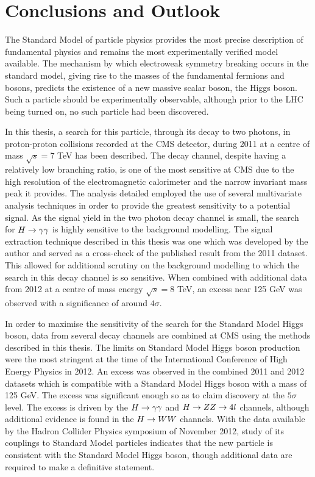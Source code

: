 \chapter{Conclusions and Outlook}
\label{chap:conclusions}

The Standard Model of particle physics provides the most precise description of 
fundamental physics and remains  the most experimentally verified
model available. The mechanism by which electroweak symmetry breaking occurs 
in the standard model, giving rise to the masses of the fundamental fermions and
bosons, predicts the existence of a new massive scalar boson, the Higgs boson.
Such a particle should be experimentally observable, although prior to the LHC being
turned on, no such particle had been discovered.

In this thesis, a search for this particle, through its decay to two photons, in proton-proton collisions recorded at the CMS detector, during 2011 at a centre of mass $\sqrt{s}=7$ TeV
has been described. 
The decay channel, despite having a 
relatively low branching ratio, is one of the most sensitive at CMS 
due to the high resolution 
of the electromagnetic calorimeter and the narrow invariant mass peak it provides.
The analysis detailed employed the use of several multivariate analysis techniques
in order to provide the greatest sensitivity to a potential signal.
As the signal yield in the two photon decay channel is small, 
the search for $H\rightarrow\gamma\gamma$ is highly sensitive to the background modelling.
The signal extraction technique described in this thesis was one which was 
developed by the author and served as a cross-check of the published result from the 2011 dataset.
This allowed for additional scrutiny on the background modelling 
to which the search in this decay channel is so sensitive. When combined with additional 
data from 2012 at a centre of mass energy $\sqrt{s}=8$ TeV, an excess near 125 GeV 
was observed with a significance of around $4\sigma$.

In order to maximise the sensitivity of the search for the Standard Model Higgs boson,
data from several decay channels are combined at CMS using the methods described in this thesis. The limits on Standard Model Higgs boson production were the most stringent at the 
time of the International Conference of High Energy Physics in 2012.
An excess was observed in the combined 2011 and 2012 datasets which is 
compatible with a Standard Model Higgs boson with a mass of 125 GeV. The excess was 
significant enough so as to claim discovery at the $5\sigma$ level. The excess is driven 
by the $H\rightarrow\gamma\gamma$ and  $H\rightarrow ZZ \rightarrow 4l$ channels, although additional evidence is found in the $H\rightarrow WW$ channels. With the data available by the Hadron Collider Physics symposium of November 2012,
study of its couplings to Standard Model particles indicates that the new particle is 
consistent with the Standard Model Higgs boson, though additional data are required to 
make a definitive statement.

